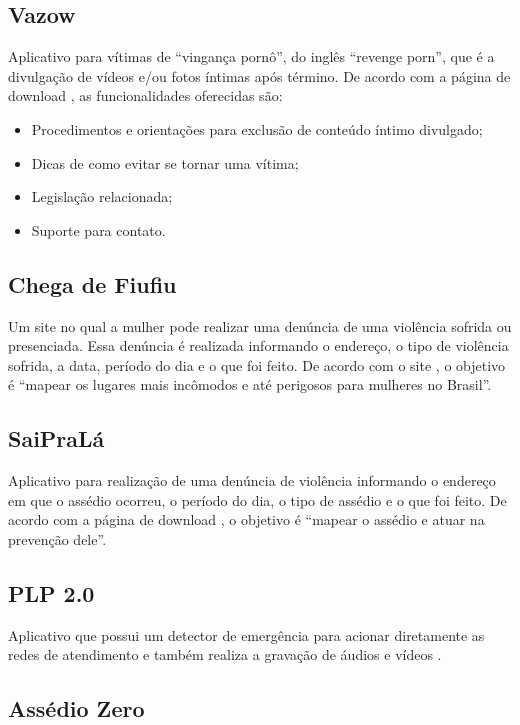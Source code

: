 \subsection*{Vazow}

Aplicativo para vítimas de ``vingança pornô'', do inglês ``revenge porn'', que é a 
divulgação de vídeos e/ou fotos íntimas após término.
De acordo com a página de download \cite{vazow}, as funcionalidades oferecidas são:

\begin{itemize}
	\item Procedimentos e orientações para exclusão de conteúdo íntimo divulgado;
	\item Dicas de como evitar se tornar uma vítima;
	\item Legislação relacionada;
	\item Suporte para contato.
\end{itemize}

\subsection*{Chega de Fiufiu}

Um site no qual a mulher pode realizar uma denúncia de uma violência sofrida ou presenciada. 
Essa denúncia é realizada informando o endereço, o tipo de violência sofrida, a data, período do dia e o que foi feito. 
De acordo com o site \cite{chegadefiufiu}, o objetivo é ``mapear 
os lugares mais incômodos e até perigosos para mulheres no Brasil''.

\subsection*{SaiPraLá}

Aplicativo para realização de uma denúncia de violência informando o endereço em que o assédio ocorreu, 
o período do dia, o tipo de assédio e o que foi feito. 
De acordo com a página de download \cite{saiprala}, o objetivo é ``mapear o assédio e atuar na prevenção dele''.

\subsection*{PLP 2.0}
Aplicativo que possui um detector de emergência para acionar diretamente as redes de atendimento 
e também realiza a gravação de áudios e vídeos \cite{plp}.

\subsection*{Assédio Zero}

